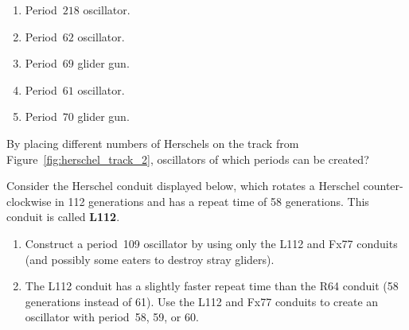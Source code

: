 \begin{multicols}{2}
\begin{problem}
		\smallskip
		
		\begin{enumerate}[label=\bf\color{ocre}(\alph*)]
			\item Period~$218$ oscillator.
			
			\item Period~$62$ oscillator.
			
			\item Period~$69$ glider gun.
			
			\item Period~$61$ oscillator.
			
			\item Period~$70$ glider gun.
		\end{enumerate}
	\end{problem}
	
	
	\mfilbreak
	
	
	\begin{problem}\label{exer:herschel_track_2_what_periods} 
		By placing different numbers of Herschels on the track from Figure~\ref{fig:herschel_track_2}, oscillators of which periods can be created?
	\end{problem}
	
	
	\mfilbreak
	
	
	\begin{problem}\label{exer:herschel_track_L112}
		Consider the Herschel conduit displayed below, which rotates a Herschel counter-clockwise in 112 generations and has a repeat time of 58 generations. This conduit is called \textbf{L112}.
		
		\begin{center}
		\end{center}
		
		\begin{enumerate}[label=\bf\color{ocre}(\alph*)]
			\item {} Construct a period~109 oscillator by using only the L112 and Fx77 conduits (and possibly some eaters to destroy stray gliders).
			
			\item {} The L112 conduit has a slightly faster repeat time than the R64 conduit (58 generations instead of 61). Use the L112 and Fx77 conduits to create an oscillator with period~58, 59, or 60.
			
		\end{enumerate}
	\end{problem}



\end{multicols}
